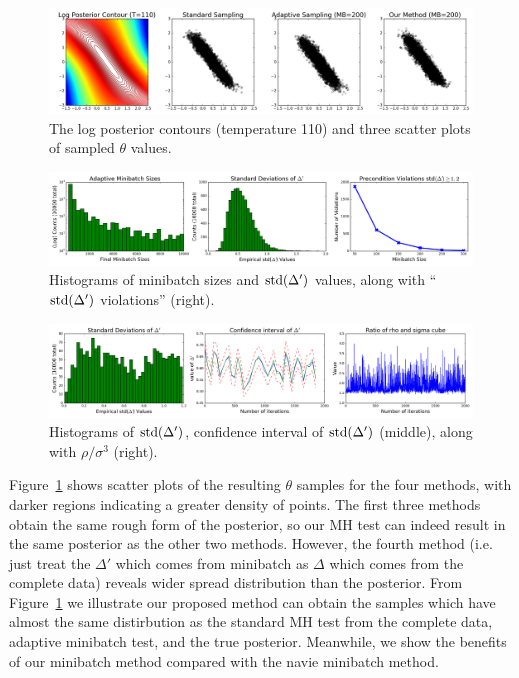 \documentclass{article}
\begin{document}
\begin{figure}[t]
    \centering
    \includegraphics[width=1\linewidth]{cloud_v01.png}
    \caption{
    The log posterior contours (temperature 110) and three scatter plots of sampled $\theta$ values.
    }
    \label{fig:gauss_mix_1}
\end{figure}

\begin{figure}[t]
    \centering
    \includegraphics[width=1\linewidth]{adaptive_and_ours_information_v01.png}
    \caption{
    Histograms of minibatch sizes and ${\rm std}(\Delta')$ values, along with ``${\rm std}(\Delta')$
    violations'' (right).
    }
    \label{fig:gauss_mix_2}
\end{figure}

\begin{figure}[t]
    \centering
    \includegraphics[width=1\linewidth]{CI_v01.png}
    \caption{
    Histograms of ${\rm std}(\Delta')$, confidence interval of ${\rm std}(\Delta')$ (middle), along with $\rho / \sigma^3$ (right).
    }
    \label{fig:gauss_mix_3}
\end{figure}

Figure~\ref{fig:gauss_mix_1} shows scatter plots of the resulting $\theta$ samples for the four
methods, with darker regions indicating a greater density of points. The first three methods obtain the
same rough form of the posterior, so our MH test can indeed result in the same posterior as the
other two methods. However, the fourth method (i.e. just treat the $\Delta'$ which comes from minibatch as $\Delta$ which comes from the complete data) reveals wider spread distribution than the posterior. From Figure~\ref{fig:gauss_mix_1} we illustrate our proposed method can obtain the samples which have almost the same distirbution as the standard MH test from the complete data, adaptive minibatch test, and the true posterior. Meanwhile, we show the benefits of our minibatch method compared with the navie minibatch method.  
\end{document}
